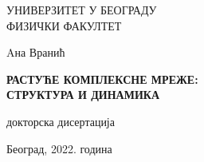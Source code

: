 
\sffamily
{}\selectfont

\begin{center}

\Large{
    УНИВЕРЗИТЕТ У БЕОГРАДУ \\
    ФИЗИЧКИ ФАКУЛТЕТ
}

\vspace{5.5cm}

\Large{
    Aна Вранић
}

\vspace{.5cm}

\LARGE{ \textbf{
    РАСТУЋЕ КОМПЛЕКСНЕ МРЕЖЕ:\\ СТРУКТУРА И ДИНАМИКА
}}

\vspace{.5cm}

\Large{
    докторска дисертација 
    
}
\vspace{9.1cm}
\Large{
    Београд, 2022. година
}
\end{center}


\pagebreak


